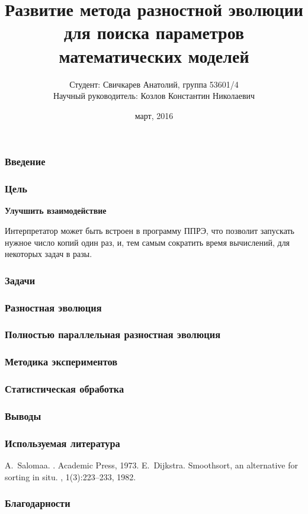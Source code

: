\documentclass{beamer}
\begin{document}
\title[Развитие ППРЭ]
{Развитие метода разностной эволюции
для поиска параметров математических моделей}
\author[Свичкарев Анатолий]
{Студент: Свичкарев Анатолий, группа 53601/4\\
Научный руководитель: Козлов Константин Николаевич}
\date{март, 2016}

\frame{\titlepage} 

\begin{frame}
\frametitle{Введение}
\end{frame}

\begin{frame}
\frametitle{Цель}
\textbf{Улучшить взаимодействие}

\bigskip
Интерпретатор может
быть встроен в программу ППРЭ,
что позволит запускать
нужное число копий один раз,
и, тем самым сократить время вычислений,
для некоторых задач в разы.
\end{frame}

\begin{frame}
\frametitle{Задачи}
\end{frame}

\begin{frame}
\frametitle{Разностная эволюция}
\end{frame}

\begin{frame}
\frametitle{Полностью параллельная разностная эволюция}
\end{frame}

\begin{frame}
\frametitle{Методика экспериментов}
\end{frame}

\begin{frame}
\frametitle{Статистическая обработка}
\end{frame}

\begin{frame}
\frametitle{Выводы}
\end{frame}

\begin{frame}
\frametitle{Используемая литература}
\begin{thebibliography}{Dijkstra, 1982}
        A.~Salomaa.
        .
        \newblock Academic Press, 1973.
        E.~Dijkstra.
        \newblock Smoothsort, an alternative for sorting in situ.
        , 1(3):223--233, 1982.
\end{thebibliography}
\end{frame}

\begin{frame}
\frametitle{Благодарности}
\end{frame}
\end{document}
